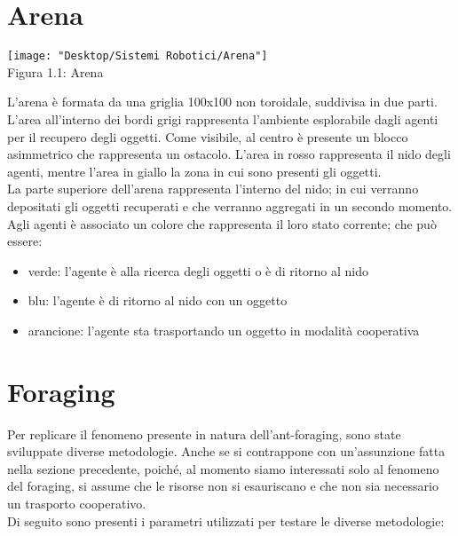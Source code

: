\documentclass[12pt,a4paper,openright,twoside]{report}
\begin{document}
\section{Arena}

\begin{center}  
	\texttt{[image: "Desktop/Sistemi Robotici/Arena"]}
	\\Figura 1.1: Arena
\end{center}

L'arena è formata da una griglia 100x100 non toroidale, suddivisa in due parti.\\
L'area all'interno dei bordi grigi rappresenta l'ambiente esplorabile dagli agenti per il recupero degli oggetti. Come visibile, al centro è presente un blocco asimmetrico che rappresenta un ostacolo. L'area in rosso rappresenta il nido degli agenti, mentre l'area in giallo la zona in cui sono presenti gli oggetti.\\
La parte superiore dell'arena rappresenta l'interno del nido; in cui verranno depositati gli oggetti recuperati e che verranno aggregati in un secondo momento.\\
Agli agenti è associato un colore che rappresenta il loro stato corrente; che può essere:

\begin{itemize}
	\item verde: l'agente è alla ricerca degli oggetti o è di ritorno al nido
	\item blu: l'agente è di ritorno al nido con un oggetto
	\item arancione: l'agente sta trasportando un oggetto in modalità cooperativa
\end{itemize}

\section{Foraging}

Per replicare il fenomeno presente in natura dell'ant-foraging, sono state sviluppate diverse metodologie.
Anche se si contrappone con un'assunzione fatta nella sezione precedente, poiché, al momento siamo interessati solo al fenomeno del foraging, si assume che le risorse non si esauriscano e che non sia necessario un trasporto cooperativo.\\
Di seguito sono presenti i parametri utilizzati per testare le diverse metodologie:\\
\end{document}
